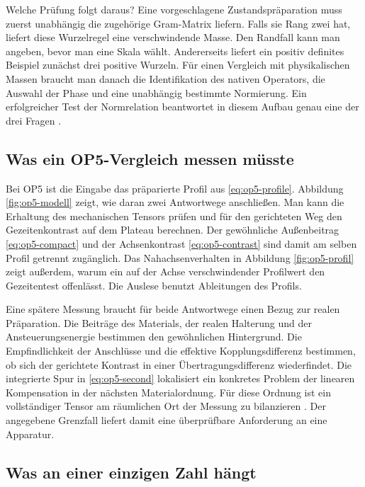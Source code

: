 Welche Prüfung folgt daraus? Eine vorgeschlagene Zustandspräparation muss zuerst unabhängig die zugehörige Gram-Matrix liefern. Falls sie Rang zwei hat, liefert diese Wurzelregel eine verschwindende Masse. Den Randfall kann man angeben, bevor man eine Skala wählt. Andererseits liefert ein positiv definites Beispiel zunächst drei positive Wurzeln. Für einen Vergleich mit physikalischen Massen braucht man danach die Identifikation des nativen Operators, die Auswahl der Phase und eine unabhängig bestimmte Normierung. Ein erfolgreicher Test der Normrelation beantwortet in diesem Aufbau genau eine der drei Fragen \cite{physics,companion}.

\subsection{Was ein OP5-Vergleich messen müsste}

Bei OP5 ist die Eingabe das präparierte Profil aus \eqref{eq:op5-profile}. Abbildung \ref{fig:op5-modell} zeigt, wie daran zwei Antwortwege anschließen. Man kann die Erhaltung des mechanischen Tensors prüfen und für den gerichteten Weg den Gezeitenkontrast auf dem Plateau berechnen. Der gewöhnliche Außenbeitrag \eqref{eq:op5-compact} und der Achsenkontrast \eqref{eq:op5-contrast} sind damit am selben Profil getrennt zugänglich. Das Nahachsenverhalten in Abbildung \ref{fig:op5-profil} zeigt außerdem, warum ein auf der Achse verschwindender Profilwert den Gezeitentest offenlässt. Die Auslese benutzt Ableitungen des Profils.

Eine spätere Messung braucht für beide Antwortwege einen Bezug zur realen Präparation. Die Beiträge des Materials, der realen Halterung und der Ansteuerungsenergie bestimmen den gewöhnlichen Hintergrund. Die Empfindlichkeit der Anschlüsse und die effektive Kopplungsdifferenz bestimmen, ob sich der gerichtete Kontrast in einer Übertragungsdifferenz wiederfindet. Die integrierte Spur in \eqref{eq:op5-second} lokalisiert ein konkretes Problem der linearen Kompensation in der nächsten Materialordnung. Für diese Ordnung ist ein vollständiger Tensor am räumlichen Ort der Messung zu bilanzieren \cite{op5-elastic-limit,op5-budget}. Der angegebene Grenzfall liefert damit eine überprüfbare Anforderung an eine Apparatur.

\subsection{Was an einer einzigen Zahl hängt}
\label{sec:one-number}

